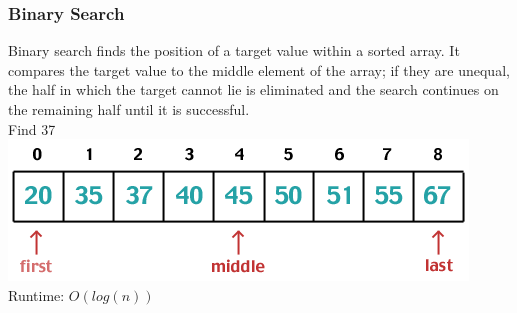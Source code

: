 \begin{frame}[fragile]
\frametitle{Binary Search}
Binary search finds the position of a target value within a sorted array.
It compares the target value to the middle element of the array; if they are unequal,
the half in which the target cannot lie is eliminated and the search continues on the
remaining half until it is successful.\\
\vspace{2mm}
Find 37\\
\includegraphics[scale=0.5]{img/binarysearch.png}\\
\vspace{2mm}
Runtime: $O(log(n))$
\end{frame}


